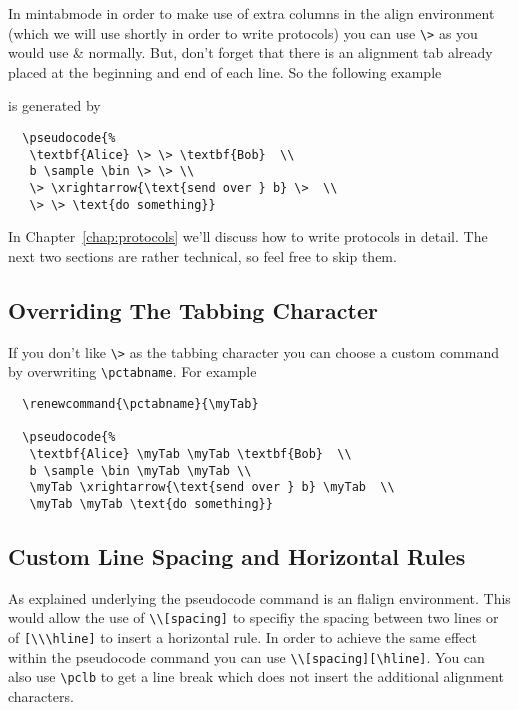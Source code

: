 \documentclass[a4paper]{report}
\begin{document}
  In mintabmode in order to make use of extra columns in the align environment (which we will use shortly in order to write protocols) you can use \lstinline$\>$ as you would use \& normally. But, don't forget that there is an alignment tab already placed at the beginning and end of each line. So the following example
  \begin{center}
  \end{center}
  is generated by
  \begin{lstlisting}
  \pseudocode{%
   \textbf{Alice} \> \> \textbf{Bob}  \\
   b \sample \bin \> \> \\
   \> \xrightarrow{\text{send over } b} \>  \\
   \> \> \text{do something}}
  \end{lstlisting}
  
  In Chapter~\ref{chap:protocols} we'll discuss how to write protocols in detail.
  The next two sections are rather technical, so feel free to skip them.
  
  
  \subsection{Overriding The Tabbing Character}
  If you don't like \lstinline$\>$ as the tabbing character you can choose a custom command by overwriting \lstinline$\pctabname$.
  For example
  \begin{lstlisting}
  \renewcommand{\pctabname}{\myTab}
  
  \pseudocode{%
   \textbf{Alice} \myTab \myTab \textbf{Bob}  \\
   b \sample \bin \myTab \myTab \\
   \myTab \xrightarrow{\text{send over } b} \myTab  \\
   \myTab \myTab \text{do something}}
  \end{lstlisting}
  
  \subsection{Custom Line Spacing and Horizontal Rules}
  As explained underlying the pseudocode command is an flalign environment. This would allow the use
  of \lstinline$\\[spacing]$ to specifiy the spacing between two lines or of \lstinline$[\\\hline]$ 
  to insert a horizontal rule. In order to achieve the same effect within the pseudocode command you
  can use \lstinline$\\[spacing][\hline]$. You can also use \lstinline$\pclb$ to get a line break which
  does not insert the additional alignment characters. 
  
\end{document}
